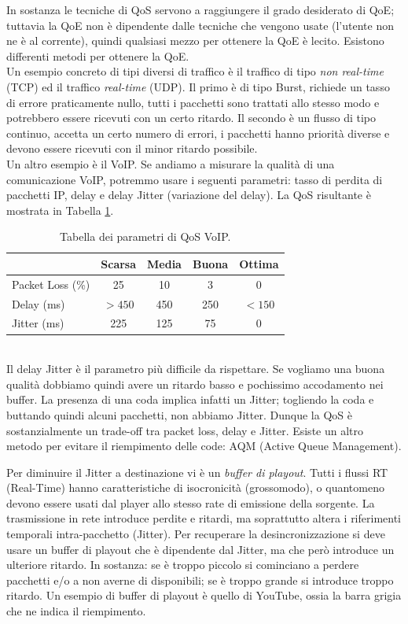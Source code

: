 In sostanza le tecniche di QoS servono a raggiungere il grado desiderato di QoE; tuttavia la QoE non è dipendente dalle tecniche che vengono usate (l'utente non ne è al corrente), quindi qualsiasi mezzo per ottenere la QoE è lecito. Esistono differenti metodi per ottenere la QoE.\\
Un esempio concreto di tipi diversi di traffico è il traffico di tipo \textit{non real-time} (TCP) ed il traffico \textit{real-time} (UDP). Il primo è di tipo Burst, richiede un tasso di errore praticamente nullo, tutti i pacchetti sono trattati allo stesso modo e potrebbero essere ricevuti con un certo ritardo. Il secondo è un flusso di tipo continuo, accetta un certo numero di errori, i pacchetti hanno priorità diverse e devono essere ricevuti con il minor ritardo possibile.\\
Un altro esempio è il VoIP. Se andiamo a misurare la qualità di una comunicazione VoIP, potremmo usare i seguenti parametri: tasso di perdita di pacchetti IP, delay e delay Jitter (variazione del delay). La QoS risultante è mostrata in Tabella \ref{tab:voip-table}.
\begin{table}[htbp]
	\centering
	\begin{tabular}{l|c|c|c|c}
		& Scarsa & Media & Buona & Ottima \\ \hline
		Packet Loss (\%) & 25 & 10 & 3 & 0 \\ 
		Delay (ms) & $>450$ & 450 & 250 & $<150$\\
		Jitter (ms) & 225 & 125 & 75 & 0
	\end{tabular}
	\caption{Tabella dei parametri di QoS VoIP.}
	\label{tab:voip-table}
\end{table}\\
Il delay Jitter è il parametro più difficile da rispettare. Se vogliamo una buona qualità dobbiamo quindi avere un ritardo basso e pochissimo accodamento nei buffer. La presenza di una coda implica infatti un Jitter; togliendo la coda e buttando quindi alcuni pacchetti, non abbiamo Jitter. Dunque la QoS è sostanzialmente un trade-off tra packet loss, delay e Jitter. Esiste un altro metodo per evitare il riempimento delle code: AQM (Active Queue Management).

Per diminuire il Jitter a destinazione vi è un \textit{buffer di playout}. Tutti i flussi RT (Real-Time) hanno caratteristiche di isocronicità (grossomodo), o quantomeno devono essere usati dal player allo stesso rate di emissione della sorgente. La trasmissione in rete introduce perdite e ritardi, ma soprattutto altera i riferimenti temporali intra-pacchetto (Jitter). Per recuperare la desincronizzazione si deve usare un buffer di playout che è dipendente dal Jitter, ma che però introduce un ulteriore ritardo. In sostanza: se è troppo piccolo si cominciano a perdere pacchetti e/o a non averne di disponibili; se è troppo grande si introduce troppo ritardo. Un esempio di buffer di playout è quello di YouTube, ossia la barra grigia che ne indica il riempimento.

